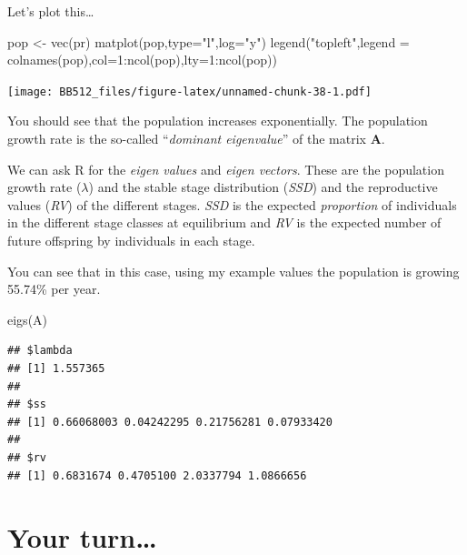 \documentclass[
  a4paper]{book}
\newenvironment{Shaded}{\begin{snugshade}}{\end{snugshade}}
\newcommand{\AttributeTok}[1]{\textcolor[rgb]{0.77,0.63,0.00}{#1}}
\newcommand{\DecValTok}[1]{\textcolor[rgb]{0.00,0.00,0.81}{#1}}
\newcommand{\FunctionTok}[1]{\textcolor[rgb]{0.00,0.00,0.00}{#1}}
\newcommand{\NormalTok}[1]{#1}
\newcommand{\OtherTok}[1]{\textcolor[rgb]{0.56,0.35,0.01}{#1}}
\newcommand{\SpecialCharTok}[1]{\textcolor[rgb]{0.00,0.00,0.00}{#1}}
\newcommand{\StringTok}[1]{\textcolor[rgb]{0.31,0.60,0.02}{#1}}
\begin{document}
Let's plot this\ldots{}

\begin{Shaded}
\begin{Highlighting}[]
\NormalTok{pop }\OtherTok{\textless{}{-}} \FunctionTok{vec}\NormalTok{(pr)}
\FunctionTok{matplot}\NormalTok{(pop,}\AttributeTok{type=}\StringTok{"l"}\NormalTok{,}\AttributeTok{log=}\StringTok{"y"}\NormalTok{)}
\FunctionTok{legend}\NormalTok{(}\StringTok{"topleft"}\NormalTok{,}\AttributeTok{legend =} \FunctionTok{colnames}\NormalTok{(pop),}\AttributeTok{col=}\DecValTok{1}\SpecialCharTok{:}\FunctionTok{ncol}\NormalTok{(pop),}\AttributeTok{lty=}\DecValTok{1}\SpecialCharTok{:}\FunctionTok{ncol}\NormalTok{(pop))}
\end{Highlighting}
\end{Shaded}

\texttt{[image: BB512\_files/figure-latex/unnamed-chunk-38-1.pdf]}

You should see that the population increases exponentially. The
population growth rate is the so-called ``\emph{dominant eigenvalue}''
of the matrix \textbf{A}.

We can ask R for the \emph{eigen values} and \emph{eigen vectors}. These
are the population growth rate (\(\lambda\)) and the stable stage
distribution (\emph{SSD}) and the reproductive values (\emph{RV}) of the
different stages. \emph{SSD} is the expected \emph{proportion} of
individuals in the different stage classes at equilibrium and \emph{RV}
is the expected number of future offspring by individuals in each stage.

You can see that in this case, using my example values the population is
growing 55.74\% per year.

\begin{Shaded}
\begin{Highlighting}[]
\FunctionTok{eigs}\NormalTok{(A)}
\end{Highlighting}
\end{Shaded}

\begin{verbatim}
## $lambda
## [1] 1.557365
## 
## $ss
## [1] 0.66068003 0.04242295 0.21756281 0.07933420
## 
## $rv
## [1] 0.6831674 0.4705100 2.0337794 1.0866656
\end{verbatim}

\hypertarget{your-turn}{%
\section{Your turn\ldots{}}\label{your-turn}}
\end{document}
